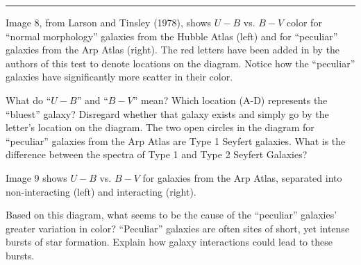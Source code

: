 \documentclass{exam}
\begin{document}
	\par\noindent \hrule
		\vspace{0.10 in}
	\par \noindent Image 8, from Larson and Tinsley (1978), shows $U-B$ vs. $B-V$ color for “normal morphology” galaxies from the Hubble Atlas (left) and for “peculiar” galaxies from the Arp Atlas (right). The red letters have been added in by the authors of this test to denote locations on the diagram. Notice how the “peculiar” galaxies have significantly more scatter in their color.
\begin{questions}
	\setcounter{question}{60}
	\question What do “$U-B$” and “$B-V$” mean?
	\question Which location (A-D) represents the “bluest” galaxy? Disregard whether that galaxy exists and simply go by the letter’s location on the diagram.
	\question The two open circles in the diagram for “peculiar” galaxies from the Arp Atlas are Type 1 Seyfert galaxies. What is the difference between the spectra of Type 1 and Type 2 Seyfert Galaxies?
\end{questions}
	\par\noindent \noindent Image 9 shows $U-B$ vs. $B-V$ for galaxies from the Arp Atlas, separated into non-interacting (left) and interacting (right).
\begin{questions}
	\setcounter{question}{63}
	\question Based on this diagram, what seems to be the cause of the “peculiar” galaxies’ greater variation in color?
	\question “Peculiar” galaxies are often sites of short, yet intense bursts of star formation. Explain how galaxy interactions could lead to these bursts.
\end{questions}
\end{document}
